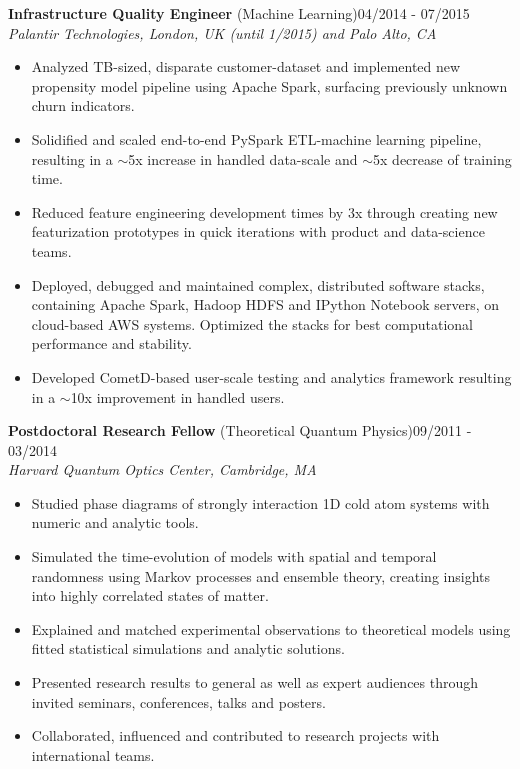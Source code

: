 \documentclass[10pt,centered]{./res} %
\begin{document}
\begin{resume}
{\bf Infrastructure Quality Engineer} (Machine Learning)\hfill04/2014 - 07/2015 \\
{\it Palantir Technologies, London, UK (until 1/2015) and Palo Alto, CA}
\begin{itemize}
  \item Analyzed TB-sized, disparate customer-dataset and implemented new propensity model pipeline using Apache Spark, surfacing previously unknown churn indicators.
  \item Solidified and scaled end-to-end PySpark ETL-machine learning pipeline, resulting in a $\sim$5x increase in handled data-scale and $\sim$5x decrease of training time.
  \item Reduced feature engineering development times by 3x through creating new featurization prototypes in quick iterations with product and data-science teams.
  \item Deployed, debugged and maintained complex, distributed software stacks, containing Apache Spark, Hadoop HDFS and IPython Notebook servers, on cloud-based AWS systems. Optimized the stacks for best computational performance and stability.
  \item Developed CometD-based user-scale testing and analytics framework resulting in a $\sim$10x improvement in handled users.
\end{itemize}

{\bf Postdoctoral Research Fellow} (Theoretical Quantum Physics)\hfill09/2011 - 03/2014 \\
{\it Harvard Quantum Optics Center, Cambridge, MA}
\begin{itemize}
  \item Studied phase diagrams of strongly interaction 1D cold atom systems with numeric and analytic tools.
  \item Simulated the time-evolution of models with spatial and temporal randomness using Markov processes and ensemble theory, creating insights into highly correlated states of matter.
  \item Explained and matched experimental observations to theoretical models using fitted statistical simulations and analytic solutions.
  \item Presented research results to general as well as expert audiences through invited seminars, conferences, talks and posters.
  \item Collaborated, influenced and contributed to research projects with international teams.
\end{itemize}


\end{resume}
\end{document}
